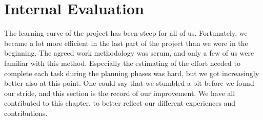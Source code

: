 \section{Internal Evaluation}\label{sec:refl_internal}
The learning curve of the project has been steep for all of us. Fortunately, we became a lot more efficient in the last part of the project than we were in the beginning. The agreed work methodology was scrum, and only a few of us were familiar with this method. Especially the estimating of the effort needed to complete each task during the planning phases was hard, but we got increasingly better also at this point. One could say that we stumbled a bit before we found our stride, and this section is the record of our improvement. We have all contributed to this chapter, to better reflect our different experiences and contributions.

